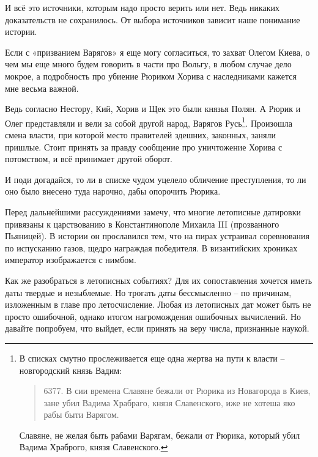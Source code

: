 
И всё это источники, которым надо просто верить или нет. Ведь никаких доказательств не сохранилось. От выбора источников зависит наше понимание истории.

Если с «призванием Варягов» я еще могу согласиться, то захват Олегом Киева, о чем мы еще много будем говорить в части про Вольгу, в любом случае дело мокрое, а подробность про убиение Рюриком Хорива с наследниками кажется мне весьма важной. 

Ведь согласно Нестору, Кий, Хорив и Щек это были князья Полян. А Рюрик и Олег представляли и вели за собой другой народ, Варягов Русь\footnote{В списках смутно прослеживается еще одна жертва на пути к власти – новгородский князь Вадим: 

\begin{quotation}
6377. В сии времена Славяне бежали от Рюрика из Новагорода в Киев, зане убил Вадима Храбраго, князя Славенского, иже не хотеша яко рабы быти Варягом.
\end{quotation}

Славяне, не желая быть рабами Варягам, бежали от Рюрика, который убил Вадима Храброго, князя Славенского.}. Произошла смена власти, при которой место правителей здешних, законных, заняли пришлые. Стоит принять за правду сообщение про уничтожение Хорива с потомством, и всё принимает другой оборот.

И поди догадайся, то ли в списке чудом уцелело обличение преступления, то ли оно было внесено туда нарочно, дабы опорочить Рюрика.

Перед дальнейшими рассуждениями замечу, что многие летописные датировки привязаны к царствованию в Константинополе Михаила III (прозванного Пьяницей). В истории он прославился тем, что на пирах устраивал соревнования по испусканию газов, щедро награждая победителя. В византийских хрониках император изображается с нимбом.

Как же разобраться в летописных событиях? Для их сопоставления хочется иметь даты твердые и незыблемые. Но трогать даты бессмысленно – по причинам, изложенным в главе про летосчисление. Любая из летописных дат может быть не просто ошибочной, однако итогом нагромождения ошибочных вычислений. Но давайте попробуем, что выйдет, если принять на веру числа, признанные наукой.

